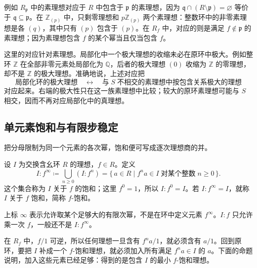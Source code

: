 例如 \(R_{\mathfrak p}\) 中的素理想对应于 \(R\) 中包含于 \(\mathfrak p\) 的素理想，因为 \(\mathfrak q\cap(R\setminus\mathfrak p)=\varnothing\) 等价于 \(\mathfrak q\subseteq\mathfrak p\)。在 \(\mathbb Z_{(p)}\) 中，只剩零理想和 \(p\mathbb Z_{(p)}\) 两个素理想：整数环中的非零素理想是各 \((q)\)，其中只有 \((p)\) 包含于 \((p)\)。在 \(R_f\) 中，对应的则是满足 \(f\notin\mathfrak p\) 的素理想；因为素理想包含 \(f\) 的某个幂当且仅当包含 \(f\)。

\ProseParagraphBreak
这里的对应针对素理想。局部化中一个极大理想的收缩未必在原环中极大。例如整环 \(\mathbb Z\) 在全部非零元素处局部化为 \(\mathbb Q\)，后者的极大理想 \((0)\) 收缩为 \(\mathbb Z\) 的零理想，却不是 \(\mathbb Z\) 的极大理想。准确地说，上述对应把
\[
	\text{局部化环的极大理想} \quad\longleftrightarrow\quad \text{与}\;S\;\text{不相交的素理想中按包含关系极大的理想}
\]
对应起来。右端的极大性只在这一族素理想中比较；较大的原环素理想可能与 \(S\) 相交，因而不再对应局部化中的真理想。

\subsection{单元素饱和与有限步稳定}
\label{b1:subsec:1304:04}

把分母限制为同一个元素的各次幂，饱和便可写成逐次理想商的并。

\begin{definition}\label{b1:def:element-saturation}
	设 \(I\) 为交换含幺环 \(R\) 的理想，\(f\in R\)。定义
	\begin{equation}\label{b1:eq:element-saturation}
		I:f^\infty\coloneqq\bigcup_{n\geq0}(I:f^n) =\{\,a\in R\mid f^na\in I\;\text{对某个整数}\;n\geq0\,\}.
	\end{equation}
	这个集合称为 \(I\) 关于 \(f\) 的饱和；这里 \(f^0=1\)，所以 \(I:f^0=I\)。若 \(I:f^\infty=I\)，就称 \(I\) 关于 \(f\) 饱和，简称 \(f\)-饱和。
\end{definition}

上标 \(\infty\) 表示允许取某个足够大的有限次幂，不是在环中定义元素 \(f^\infty\)。\(I:f\) 只允许乘一次 \(f\)，一般还不是 \(I:f^\infty\)。

\ProseParagraphBreak
在 \(R_f\) 中，\(f/1\) 可逆，所以任何理想一旦含有 \(f^na/1\)，就必须含有 \(a/1\)。回到原环，要把 \(I\) 补成一个 \(f\)-饱和理想，就必须加入所有满足 \(f^na\in I\) 的 \(a\)。下面的命题说明，加入这些元素已经足够：得到的是包含 \(I\) 的最小 \(f\)-饱和理想。

